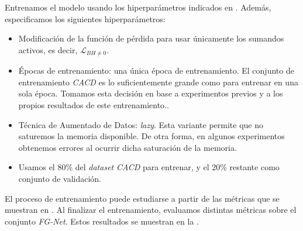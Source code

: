 Entrenamos el modelo usando los hiperparámetros indicados en . Además, especificamos los siguientes hiperparámetros:

\begin{itemize}
    \item Modificación de la función de pérdida para usar únicamente los sumandos activos, es decir, $\mathcal{L}_{BH \neq 0}$.
    \item Épocas de entrenamiento: una única época de entrenamiento. El conjunto de entrenamiento \textit{CACD} es lo suficientemente grande como para entrenar en una sola época. Tomamos esta decisión en base a experimentos previos y a los propios resultados de este entrenamiento..
    \item Técnica de Aumentado de Datos: \textit{lazy}. Esta variante permite que no saturemos la memoria disponible. De otra forma, en algunos experimentos obtenemos errores al ocurrir dicha saturación de la memoria.
    \item Usamos el 80\% del \textit{dataset} \textit{CACD} para entrenar, y el 20\% restante como conjunto de validación.
\end{itemize}

El proceso de entrenamiento puede estudiarse a partir de las métricas que se muestran en . Al finalizar el entrenamiento, evaluamos distintas métricas sobre el conjunto \textit{FG-Net}. Estos resultados se muestran en la .


